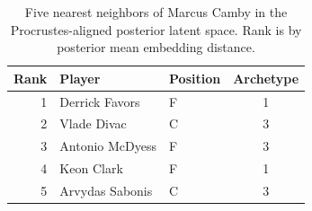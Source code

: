 \begin{table}[htbp]
  \centering\small
  \begin{tabular}{rllc}
    \toprule
    Rank & Player & Position & Archetype \\
    \midrule
    1 & Derrick Favors & F & 1 \\
    2 & Vlade Divac & C & 3 \\
    3 & Antonio McDyess & F & 3 \\
    4 & Keon Clark & F & 1 \\
    5 & Arvydas Sabonis & C & 3 \\
    \bottomrule
  \end{tabular}
  \caption{Five nearest neighbors of Marcus Camby in the Procrustes-aligned posterior latent space. Rank is by posterior mean embedding distance.}
  \label{tab:Marcus_Camby_neighbors}
\end{table}

